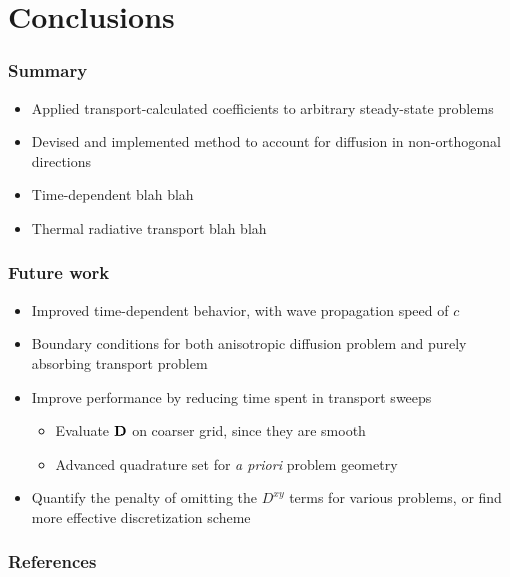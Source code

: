 \documentclass{beamer}
\newcommand{\Dtens}{\mat{D}}
\begin{document}
\section{Conclusions}
\begin{frame}
  \frametitle{Summary}
  \begin{itemize}
    \item Applied transport-calculated coefficients to arbitrary steady-state
      problems
    \item Devised and implemented method to account for diffusion in
      non-orthogonal directions
    \item Time-dependent blah blah
    \item Thermal radiative transport blah blah
  \end{itemize}
\end{frame}
\begin{frame}
  \frametitle{Future work}
  \begin{itemize}
    \item Improved time-dependent behavior, with wave propagation speed of $c$
    \item Boundary conditions for both anisotropic diffusion problem and
      purely absorbing transport problem
    \item Improve performance by reducing time spent in transport sweeps
      \begin{itemize}
        \item Evaluate $\Dtens$ on coarser grid, since they are smooth
        \item Advanced quadrature set for \emph{a priori} problem geometry
      \end{itemize}
    \item Quantify the penalty of omitting the $D^{xy}$ terms for various
      problems, or find more effective discretization scheme
  \end{itemize}
\end{frame}
\appendix
\begin{frame}
  \frametitle{References}


\end{frame}

\end{document}
